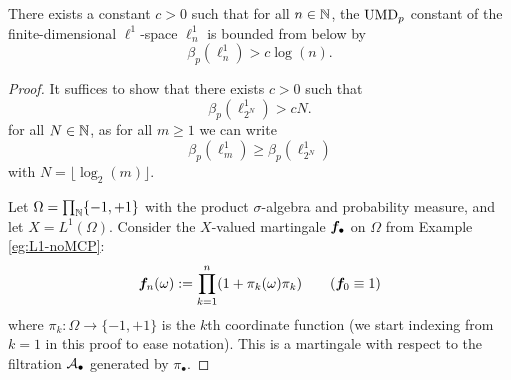 \begin{thm}\label{thm:L1-not-UMD}
  There exists a constant $c > 0$ such that for all $n \in \mathbb{N}$, the $\mathrm{UMD}_{p}$ constant of the finite-dimensional $\ell^1$-space $\ell^{1}_{n}$ is bounded from below by
  \begin{equation*}
    \beta_{p}(\ell^{1}_{n}) > c\log(n).
  \end{equation*}
\end{thm}

\begin{proof}
  It suffices to show that there exists $c > 0$ such that
  \begin{equation*}
    \beta_{p}(\ell^{1}_{2^N}) > cN.
  \end{equation*}
  for all $N \in \mathbb{N}$, as for all $m \geq 1$ we can write
  \begin{equation*}
    \beta_{p}(\ell^1_{m}) \geq \beta_{p}(\ell^1_{2^N})
  \end{equation*}
  with $N = \lfloor \log_{2}(m) \rfloor$.

  Let $\Omega = \prod_{\mathbb{N}} \{-1,+1\}$ with the product $\sigma$-algebra and probability measure, and let $X = L^1(\Omega)$.
  Consider the $X$-valued martingale $\bm{f}_{\bullet}$ on $\Omega$ from Example \ref{eg:L1-noMCP}:
  \begin{equation*}
    \bm{f}_{n}(\omega) := \prod_{k = 1}^{n} (1 + \pi_{k}(\omega)\pi_{k})  \qquad (\bm{f}_{0} \equiv 1)
  \end{equation*}
  where $\pi_{k} \colon \Omega \to \{-1,+1\}$ is the $k$th coordinate function (we start indexing from $k = 1$ in this proof to ease notation).
  This is a martingale with respect to the filtration $\mathcal{A}_{\bullet}$ generated by $\pi_{\bullet}$.
  

\end{proof}
